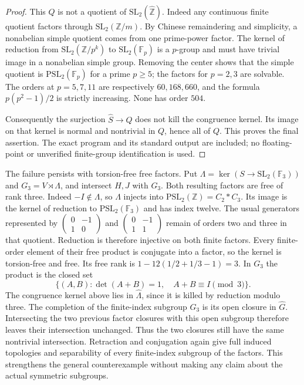 \begin{proof}
This $Q$ is not a quotient of
$\mathrm{SL}_2(\widehat{\mathbb Z})$.
Indeed any continuous finite quotient factors through
$\mathrm{SL}_2(\mathbb Z/m)$.  By Chinese remaindering and
simplicity, a nonabelian simple quotient comes from one
prime-power factor.  The kernel of reduction from
$\mathrm{SL}_2(\mathbb Z/p^k)$ to
$\mathrm{SL}_2(\mathbb F_p)$ is a $p$-group and must have
trivial image in a nonabelian simple group.  Removing the
center shows that the simple quotient is
$\mathrm{PSL}_2(\mathbb F_p)$ for a prime $p\geq5$;
the factors for $p=2,3$ are solvable.
The orders at $p=5,7,11$ are respectively $60,168,660$,
and the formula $p(p^2-1)/2$ is strictly increasing.
None has order $504$.

Consequently the surjection $\widehat S\to Q$ does not
kill the congruence kernel.  Its image on that kernel is
normal and nontrivial in $Q$, hence all of $Q$.
This proves the final assertion.  The exact program and its
standard output are included; no floating-point or
unverified finite-group identification is used.
\end{proof}

The failure persists with torsion-free free factors.
Put $\Lambda=\ker(S\to\mathrm{SL}_2(\mathbb F_3))$ and
$G_3=V\rtimes\Lambda$, and intersect $H,J$ with $G_3$.
Both resulting factors are free of rank three.
Indeed $-I\notin\Lambda$, so $\Lambda$ injects into
$\mathrm{PSL}_2(\mathbb Z)=C_2*C_3$.
Its image is the kernel of reduction to
$\mathrm{PSL}_2(\mathbb F_3)$ and has index twelve.
The usual generators represented by
$\left(\begin{smallmatrix}0&-1\\1&0\end{smallmatrix}\right)$
and $\left(\begin{smallmatrix}0&-1\\1&1\end{smallmatrix}\right)$
remain of orders two and three in that quotient.
Reduction is therefore injective on both finite factors.
Every finite-order element of their free product is conjugate
into a factor, so the kernel is torsion-free and free.
Its free rank is $1-12(1/2+1/3-1)=3$.
In $G_3$ the product is the closed set
\[
 \{(A,B):\det(A+B)=1,\quad A+B\equiv I\pmod3\}.
\]
The congruence kernel above lies in $\widehat\Lambda$,
since it is killed by reduction modulo three.
The completion of the finite-index subgroup $G_3$ is its
open closure in $\widehat G$.
Intersecting the two previous factor closures with this
open subgroup therefore leaves their intersection unchanged.
Thus the two closures still have the same nontrivial
intersection.  Retraction and conjugation again give
full induced topologies and separability of every
finite-index subgroup of the factors.
This strengthens the general counterexample without
making any claim about the actual symmetric subgroups.

